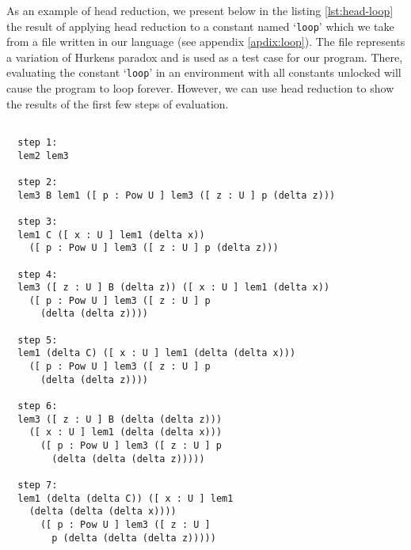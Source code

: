 As an example of head reduction, we present below in the listing \ref{lst:head-loop} the result of applying head reduction to a constant named `\texttt{loop}' which we take from a file written in our language (see appendix \ref{apdix:loop}). The file represents a variation of Hurkens paradox \cite{hurkens1995simplification} and is used as a test case for our program. There, evaluating the constant `\texttt{loop}' in an environment with all constants unlocked will cause the program to loop forever. However, we can use head reduction to show the results of the first few steps of evaluation.

\begin{lstlisting}[caption=Results of Head Reduction on the Constant Loop,label=lst:head-loop, basicstyle=\ttfamily]

  step 1:
  lem2 lem3

  step 2:
  lem3 B lem1 ([ p : Pow U ] lem3 ([ z : U ] p (delta z)))

  step 3:
  lem1 C ([ x : U ] lem1 (delta x))
    ([ p : Pow U ] lem3 ([ z : U ] p (delta z)))

  step 4:
  lem3 ([ z : U ] B (delta z)) ([ x : U ] lem1 (delta x))
    ([ p : Pow U ] lem3 ([ z : U ] p
      (delta (delta z))))

  step 5:
  lem1 (delta C) ([ x : U ] lem1 (delta (delta x)))
    ([ p : Pow U ] lem3 ([ z : U ] p
      (delta (delta z))))

  step 6:
  lem3 ([ z : U ] B (delta (delta z)))
    ([ x : U ] lem1 (delta (delta x)))
      ([ p : Pow U ] lem3 ([ z : U ] p
        (delta (delta (delta z)))))

  step 7:
  lem1 (delta (delta C)) ([ x : U ] lem1
    (delta (delta (delta x))))
      ([ p : Pow U ] lem3 ([ z : U ]
        p (delta (delta (delta z)))))
\end{lstlisting}